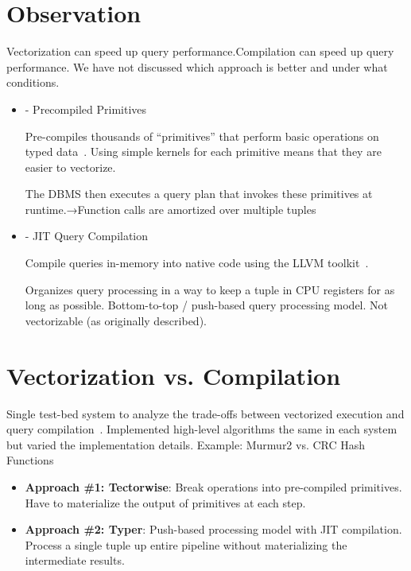 \documentclass[11pt]{article}
\begin{document}
\maketitle
\thispagestyle{plain}

\section{Observation}
Vectorization can speed up query performance.Compilation can speed up query performance. We have 
not discussed which approach is better and under what conditions.
\begin{itemize}
    \item 
     - Precompiled Primitives
    
    Pre-compiles thousands of “primitives” that perform basic operations on typed data~\cite{Rundefinedducanu2013}. Using simple kernels for each primitive means that they are easier to vectorize.
    
    The DBMS then executes a query plan that invokes these primitives at runtime.→Function calls 
    are amortized over multiple tuples
    
    \item
     - JIT Query Compilation
    
    Compile queries in-memory into native code using the LLVM toolkit~\cite{Neumann2011}.
    
    Organizes query processing in a way to keep a tuple in CPU registers for as long as possible.  
    Bottom-to-top / push-based query processing model. Not vectorizable (as originally described).
\end{itemize}

\section{Vectorization vs. Compilation}
Single test-bed system to analyze the trade-offs between vectorized execution and query 
compilation~\cite{Kersten2018}. Implemented high-level algorithms the same in each system but 
varied the implementation details. Example: Murmur2 vs. CRC Hash Functions
\begin{itemize}
    \item 
    \textbf{Approach \#1: Tectorwise}:
    Break operations into pre-compiled primitives.
    Have to materialize the output of primitives at each step. 
    
    \item 
    \textbf{Approach \#2: Typer}:
    Push-based processing model with JIT compilation.
    Process a single tuple up entire pipeline without materializing the intermediate results.
\end{itemize}
    
\end{document}
